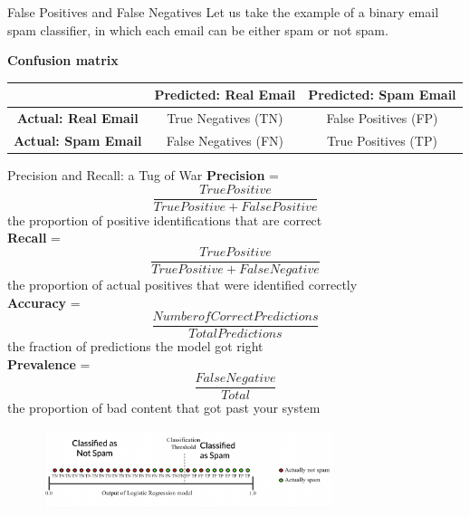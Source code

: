 \documentclass[nobackground,dvipsnames,table]{beamer}
\begin{document}
\begin{frame}{False Positives and False Negatives}
    Let us take the example of a binary email spam classifier, in which each email can be either spam or not spam.
    
    \textbf{Confusion matrix}
    \begin{tabularx}{0.8\textwidth}{|c|c|c|}%
        \hline
        & \textbf{Predicted: Real Email} & \textbf{Predicted: Spam Email} \\
        \hline
        \textbf{Actual: Real Email} & True Negatives (TN) & False Positives (FP)\\
        \hline
        \textbf{Actual: Spam Email} & False Negatives (FN) & True Positives (TP) \\
        \hline
    \end{tabularx}
\end{frame}

\begin{frame}{Precision and Recall: a Tug of War} %
    \footnotesize
    \textbf{Precision} = $$\frac{True Positive}{True Positive + False Positive}$$ the proportion of positive identifications that are correct\\
    \textbf{Recall} = $$\frac{True Positive}{True Positive + False Negative}$$ the proportion of actual positives that were identified correctly\\
    \textbf{Accuracy} = $$\frac{Number of Correct Predictions}{Total Predictions}$$ the fraction of predictions the model got right\\
    \textbf{Prevalence} = $$\frac{False Negative}{Total}$$ the proportion of bad content that got past your system
    \begin{figure}
        \centering
        \includegraphics[width=0.75\textwidth]{spam-classification}
    \end{figure}
\end{frame}
\end{document}
